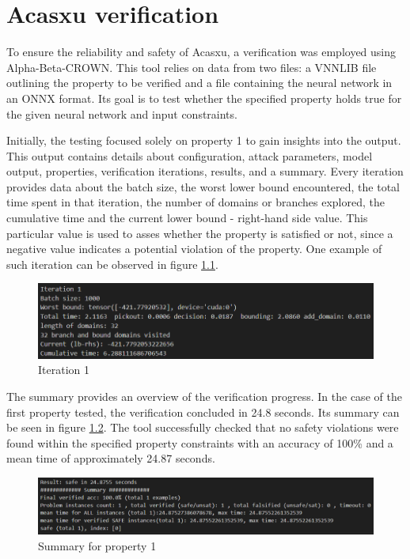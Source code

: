 \chapter{Acasxu verification}
\label{chap:ch3}

\par To ensure the reliability and safety of Acasxu, a verification was employed using Alpha-Beta-CROWN. This tool relies on data from two files: a VNNLIB file outlining the property to be verified and a file containing the neural network in an ONNX format. Its goal is to test whether the specified property holds true for the given neural network and input constraints. 

\par Initially, the testing focused solely on property 1 to gain insights into the output. This output contains details about configuration, attack parameters, model output, properties, verification iterations, results, and a summary. Every iteration provides data about the batch size, the worst lower bound encountered, the total time spent in that iteration, the number of domains or branches explored, the cumulative time and the current lower bound - right-hand side value. This particular value is used to asses whether the property is satisfied or not, since a negative value indicates a potential violation of the property. One example of such iteration can be observed in figure \ref{Fig_It1}.

\begin{figure}[htbp]
	\centering
		\includegraphics[width=12cm]{./Figures/it1.png}
	\caption{Iteration 1}
	\label{Fig_It1}
\end{figure}

\par The summary provides an overview of the verification progress. In the case of the first property tested, the verification concluded in 24.8 seconds. Its summary can be seen in figure \ref{Fig_Summary1}. The tool successfully checked that no safety violations were found within the specified property constraints with an accuracy of 100\% and a mean time of approximately 24.87 seconds.

\begin{figure}[htbp]
	\centering
		\includegraphics[width=12cm]{./Figures/summary1.png}
	\caption{Summary for property 1}
	\label{Fig_Summary1}
\end{figure}


